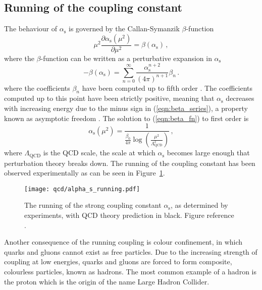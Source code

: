\documentclass[main.tex]{subfiles}
\begin{document}
\subsection{Running of the coupling constant}
    The behaviour of $\alpha_{\mathrm{s}}$
    is governed by the Callan-Symanzik \cite{Callan:1970yg,Symanzik:1970rt}
    $\beta$-function
    \begin{equation}\label{eqn:beta_fn}
        \mu^{2} \dfrac{\partial \alpha_{\mathrm{s}}(\mu^{2})}{\partial \mu^{2}} = \beta(\alpha_{\mathrm{s}}) \, ,
    \end{equation}
    where the $\beta$-function can be written as a perturbative
    expansion in $\alpha_{\mathrm{s}}$
    \begin{equation}\label{eqn:beta_series}
        -\beta(\alpha_{\mathrm{s}}) = \sum_{n=0}^{\infty}\dfrac{\alpha_{\mathrm{s}}^{n+2}}{(4\pi)^{n+1}} \beta_{n}\, .
    \end{equation}
    where the coefficients $\beta_{n}$ have been computed
    up to fifth order \cite{Baikov:2016tgj,Luthe:2017ttg}.
    The coefficients computed up to this point have been
    strictly positive, meaning that $\alpha_{\mathrm{s}}$
    decreases with increasing energy due to the minus sign
    in (\ref{eqn:beta_series}), a property known as
    asymptotic freedom \cite{Gross:1973id,Politzer:1973fx}.
    The solution to (\ref{eqn:beta_fn}) to first order
    is
    \begin{equation}\label{eqn:1l_alpha}
        \alpha_{\mathrm{s}}(\mu^{2}) = \dfrac{1}{\frac{\beta_{0}}{4\pi}\log\left(\frac{\mu^{2}}{\Lambda_{\mathrm{QCD}}^{2}}\right)} \, ,
    \end{equation}
    where $\Lambda_{\mathrm{QCD}}$ is the QCD scale,
    the scale at which $\alpha_{\mathrm{s}}$ becomes
    large enough that perturbation theory breaks down.
    The running of the coupling constant has been
    observed experimentally as can be seen in Figure~\ref{fig:alpha_s_running}.
    \begin{figure}
        \texttt{[image: qcd/alpha\_s\_running.pdf]}
        \caption{The running of the strong coupling constant $\alpha_{\mathrm{s}}$,
        as determined by experiments, with QCD theory prediction in black.
        Figure reference \cite{Workman:2022ynf}.}
        \label{fig:alpha_s_running}
    \end{figure}
    Another consequence of the running coupling
    is colour confinement, in which quarks and
    gluons cannot exist as free particles. Due
    to the increasing strength of coupling at low
    energies, quarks and gluons are forced to
    form composite, colourless particles, known as
    hadrons. The most common example of a hadron
    is the proton which is the origin of the name
    Large Hadron Collider.
\end{document}
